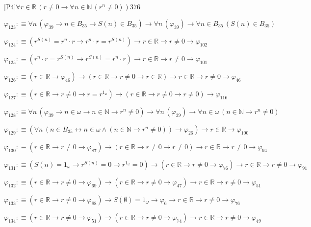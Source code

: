 \begin{fullproof}{[P4]}{$\forall r \in \mathbb{R}\,(r \neq 0 \to \forall n \in \mathbb{N}\,({{r}^{n}} \neq 0))$}{376}
\begin{abbrevlist}
\item $\varphi_{123} :\equiv \forall n\,(\varphi_{39} \to n \in B_{35} \to S(n) \in B_{35}) \to \forall n\,(\varphi_{39}) \to \forall n \in B_{35}\,(S(n) \in B_{35})$
\item $\varphi_{124} :\equiv ({{r}^{S(n)}} = {{r}^{n}} \cdot r \to {{r}^{n}} \cdot r = {{r}^{S(n)}}) \to r \in \mathbb{R} \to r \neq 0 \to \varphi_{102}$
\item $\varphi_{125} :\equiv ({{r}^{n}} \cdot r = {{r}^{S(n)}} \to {{r}^{S(n)}} = {{r}^{n}} \cdot r) \to r \in \mathbb{R} \to r \neq 0 \to \varphi_{101}$
\item $\varphi_{126} :\equiv (r \in \mathbb{R} \to \varphi_{46}) \to (r \in \mathbb{R} \to r \neq 0 \to r \in \mathbb{R}) \to r \in \mathbb{R} \to r \neq 0 \to \varphi_{46}$
\item $\varphi_{127} :\equiv (r \in \mathbb{R} \to r \neq 0 \to r = {{r}^{1_{\omega}}}) \to (r \in \mathbb{R} \to r \neq 0 \to r \neq 0) \to \varphi_{116}$
\item $\varphi_{128} :\equiv \forall n\,(\varphi_{39} \to n \in \omega \to n \in \mathbb{N} \to {{r}^{n}} \neq 0) \to \forall n\,(\varphi_{39}) \to \forall n \in \omega\,(n \in \mathbb{N} \to {{r}^{n}} \neq 0)$
\item $\varphi_{129} :\equiv (\forall n\,(n \in B_{35} \leftrightarrow n \in \omega \land (n \in \mathbb{N} \to {{r}^{n}} \neq 0)) \to \varphi_{26}) \to r \in \mathbb{R} \to \varphi_{100}$
\item $\varphi_{130} :\equiv (r \in \mathbb{R} \to r \neq 0 \to \varphi_{87}) \to (r \in \mathbb{R} \to r \neq 0 \to r \neq 0) \to r \in \mathbb{R} \to r \neq 0 \to \varphi_{94}$
\item $\varphi_{131} :\equiv (S(n) = 1_{\omega} \to {{r}^{S(n)}} = 0 \to {{r}^{1_{\omega}}} = 0) \to (r \in \mathbb{R} \to r \neq 0 \to \varphi_{76}) \to r \in \mathbb{R} \to r \neq 0 \to \varphi_{91}$
\item $\varphi_{132} :\equiv (r \in \mathbb{R} \to r \neq 0 \to \varphi_{69}) \to (r \in \mathbb{R} \to r \neq 0 \to \varphi_{47}) \to r \in \mathbb{R} \to r \neq 0 \to \varphi_{51}$
\item $\varphi_{133} :\equiv (r \in \mathbb{R} \to r \neq 0 \to \varphi_{88}) \to S(\emptyset) = 1_{\omega} \to \varphi_{6} \to r \in \mathbb{R} \to r \neq 0 \to \varphi_{76}$
\item $\varphi_{134} :\equiv (r \in \mathbb{R} \to r \neq 0 \to \varphi_{51}) \to (r \in \mathbb{R} \to r \neq 0 \to \varphi_{74}) \to r \in \mathbb{R} \to r \neq 0 \to \varphi_{49}$

\end{abbrevlist}
\end{fullproof}
